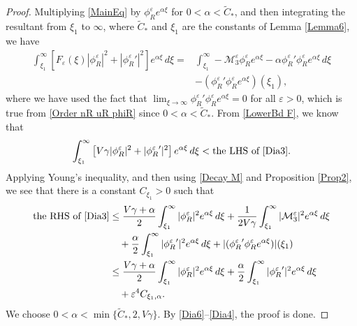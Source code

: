 \documentclass{amsart}
\newcommand{\veps}{\varepsilon}
\numberwithin{equation}{section}
\theoremstyle{plain}%
\theoremstyle{definition}
\theoremstyle{remark}
\theoremstyle{remark}
\begin{document}
\begin{proof}
Multiplying \eqref{MainEq} by $\phi_R^\veps e^{\alpha\xi}$ for $0<\alpha<\widetilde{C}_\ast$, and then integrating the resultant from $\xi_1$ to $\infty$, where $\widetilde{C}_\ast$ and $\xi_1$  are the constants of Lemma \ref{Lemma6}, we have
\begin{equation}\label{Dia3}
\begin{split}
\int_{\xi_1}^\infty \left[ F_\veps(\xi)|\phi_R^\veps|^2 +|{\phi_R^\veps}'|^2 \right] e^{\alpha\xi} \,d\xi
 = & \int_{\xi_1}^\infty-\mathcal{M}_3^\veps\phi_R^\veps e^{\alpha\xi}  -\alpha {\phi_R^\veps}'\phi_R^\veps e^{\alpha\xi} \,d\xi \\
& - ({\phi_R^\veps}'\phi_R^\veps e^{\alpha\xi})(\xi_1),
\end{split}
\end{equation}
where we have used the fact that $\lim_{\xi \to \infty}{\phi_R^\veps}'\phi_R^\veps e^{\alpha \xi} = 0$ for all $\veps >0$, which is true from \eqref{Order nR uR phiR} since $0<\alpha<\widetilde{C}_\ast$. From \eqref{LowerBd F}, we know that
\begin{equation}\label{Dia6}
\int_{\xi_1}^\infty \left[ V\gamma|\phi_R^\veps|^2 +|{\phi_R^\veps}'|^2\right]e^{\alpha\xi} \,d\xi < \text{the LHS of \eqref{Dia3}}.
\end{equation} 
Applying Young's inequality, and then using \eqref{Decay M} and Proposition \ref{Prop2}, we see that there is a constant $C_{\xi_1}>0$ such that 
\begin{equation}\label{Dia4}
\begin{split}
\text{the RHS of \eqref{Dia3}}
& \leq \frac{V\gamma+\alpha}{2}\int_{\xi_1}^\infty |\phi_R^\veps|^2e^{\alpha\xi}\,d\xi + \frac{1}{2V\gamma}\int_{\xi_1}^\infty |\mathcal{M}_3^\veps|^2 e^{\alpha\xi}\,d\xi \\
& \quad + \frac{\alpha}{2}\int_{\xi_1}^\infty |{\phi_R^\veps}'|^2e^{\alpha\xi}\,d\xi + |({\phi_R^\veps}'\phi_R^\veps e^{\alpha\xi})|(\xi_1) \\
& \leq \frac{V\gamma+\alpha}{2}\int_{\xi_1}^\infty |\phi_R^\veps|^2e^{\alpha\xi}\,d\xi + \frac{\alpha}{2}\int_{\xi_1}^\infty |{\phi_R^\veps}'|^2e^{\alpha\xi}\,d\xi \\
&\quad  + \veps^4 C_{\xi_1,\alpha}.
\end{split}
\end{equation}
We choose $0<\alpha<\min\{\widetilde{C}_\ast,2,V\gamma\}$. By \eqref{Dia6}--\eqref{Dia4}, the proof is done.
\end{proof}
\end{document}
